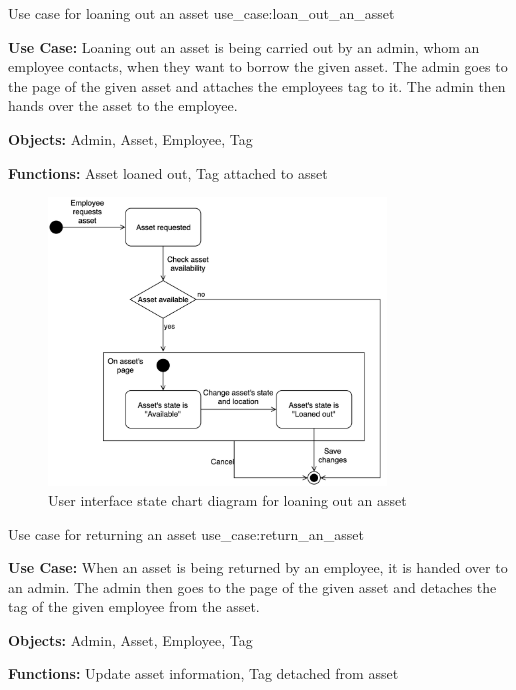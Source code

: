 \newpage

    {Use case for loaning out an asset}
    {use_case:loan_out_an_asset}
    {
        \textbf{Use Case:} Loaning out an asset is being carried out by an admin, whom an employee contacts, when they want to borrow the given asset. The admin goes to the page of the given asset and attaches the employees tag to it. The admin then hands over the asset to the employee.
    
        \vskip 0.2cm
        
        \textbf{Objects:} Admin, Asset, Employee, Tag
        
        \vskip 0.2cm
        
        \textbf{Functions:} Asset loaned out, Tag attached to asset
    }
 
\begin{figure}[H]
    \centering
    \includegraphics[width=0.8\textwidth]{figures/UseCases/UC_Loan_out_asset.png}
    \caption{User interface state chart diagram for loaning out an asset}
    \label{fig:loan_out_asse_statechart}
\end{figure}
 
    {Use case for returning an asset}
    {use_case:return_an_asset}
    {
        \textbf{Use Case:} When an asset is being returned by an employee, it is handed over to an admin. The admin then goes to the page of the given asset and detaches the tag of the given employee from the asset.
    
        \vskip 0.2cm
        
        \textbf{Objects:} Admin, Asset, Employee, Tag
        
        \vskip 0.2cm
        
        \textbf{Functions:} Update asset information, Tag detached from asset
    }
    
